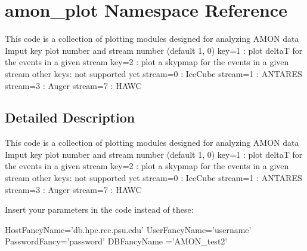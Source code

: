 \hypertarget{namespaceamon__plot}{\section{amon\-\_\-plot Namespace Reference}
\label{namespaceamon__plot}
}


\begin{DoxyVerb} This code is a collection of plotting modules
 designed for analyzing AMON data
 Imput key plot number and stream number (default 1, 0)
 key=1 : plot deltaT for the events in a given stream
 key=2 : plot a skypmap for the events in a given stream
 other keys: not supported yet
 stream=0 : IceCube
 stream=1 : ANTARES 
 stream=3 : Auger
 stream=7 : HAWC\end{DoxyVerb}
  




\subsection{Detailed Description}
\begin{DoxyVerb} This code is a collection of plotting modules
 designed for analyzing AMON data
 Imput key plot number and stream number (default 1, 0)
 key=1 : plot deltaT for the events in a given stream
 key=2 : plot a skypmap for the events in a given stream
 other keys: not supported yet
 stream=0 : IceCube
 stream=1 : ANTARES 
 stream=3 : Auger
 stream=7 : HAWC\end{DoxyVerb}
 Insert your parameters in the code instead of these\-:

Host\-Fancy\-Name='db.\-hpc.\-rcc.\-psu.\-edu' User\-Fancy\-Name='username' Password\-Fancy='password' D\-B\-Fancy\-Name ='A\-M\-O\-N\-\_\-test2' 